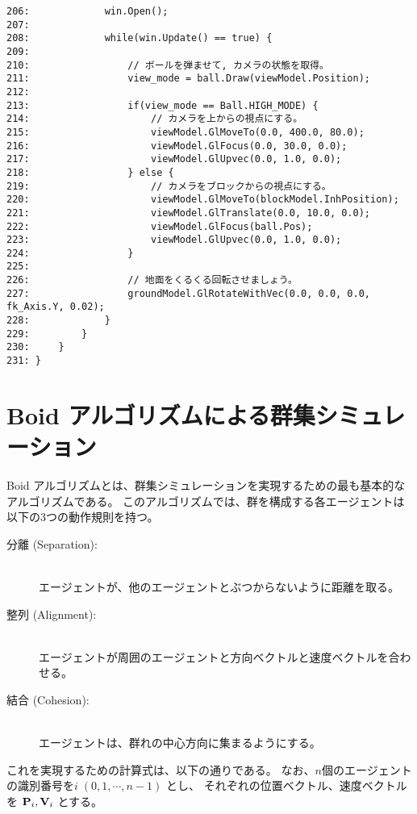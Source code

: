 \begin{breakbox}
\begin{small}
\begin{verbatim}
206:             win.Open();
207: 
208:             while(win.Update() == true) {
209: 
210:                 // ボールを弾ませて, カメラの状態を取得。
211:                 view_mode = ball.Draw(viewModel.Position);
212: 
213:                 if(view_mode == Ball.HIGH_MODE) {
214:                     // カメラを上からの視点にする。
215:                     viewModel.GlMoveTo(0.0, 400.0, 80.0);
216:                     viewModel.GlFocus(0.0, 30.0, 0.0);
217:                     viewModel.GlUpvec(0.0, 1.0, 0.0);
218:                 } else {
219:                     // カメラをブロックからの視点にする。
220:                     viewModel.GlMoveTo(blockModel.InhPosition);
221:                     viewModel.GlTranslate(0.0, 10.0, 0.0);
222:                     viewModel.GlFocus(ball.Pos);
223:                     viewModel.GlUpvec(0.0, 1.0, 0.0);
224:                 }
225: 
226:                 // 地面をくるくる回転させましょう。
227:                 groundModel.GlRotateWithVec(0.0, 0.0, 0.0, fk_Axis.Y, 0.02);
228:             }
229:         }
230:     }
231: }
\end{verbatim}
\end{small}
\end{breakbox}

\section{Boid アルゴリズムによる群集シミュレーション}
Boid アルゴリズムとは、群集シミュレーションを実現するための最も基本的なアルゴリズムである。
このアルゴリズムでは、群を構成する各エージェントは以下の3つの動作規則を持つ。

\begin{description}
\item[分離 (Separation):] ~ \\
	エージェントが、他のエージェントとぶつからないように距離を取る。

\item[整列 (Alignment):] ~ \\
	エージェントが周囲のエージェントと方向ベクトルと速度ベクトルを合わせる。

\item[結合 (Cohesion):] ~ \\
	エージェントは、群れの中心方向に集まるようにする。

\end{description}
これを実現するための計算式は、以下の通りである。
なお、\(n\)個のエージェントの識別番号を\(i \; (0, 1, \cdots, n-1)\) とし、
それぞれの位置ベクトル、速度ベクトルを \(\mathbf{P}_i, \mathbf{V}_i\) とする。

